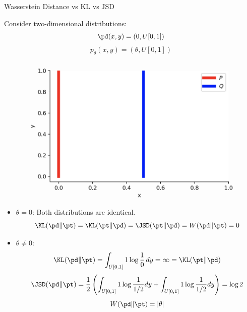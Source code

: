 \documentclass{beamer}
\begin{document}
\begin{frame}{Wasserstein Distance vs KL vs JSD}
	\begin{minipage}[t]{0.48\columnwidth}
		Consider two-dimensional distributions:
		\vspace{-0.3cm}
		\[
			\pd(x, y) = (0, U[0, 1])
		\]	
		\[
			p_{\theta}(x, y) = (\theta, U[0, 1])
		\]
	\end{minipage}%
	\begin{minipage}[t]{0.52\columnwidth}
		\vspace{-0.3cm}
		\begin{figure}
			\centering
			\includegraphics[width=0.8\linewidth]{figs/w_kl_jsd}
		\end{figure}
	\end{minipage}
	\vspace{-0.3cm}
	\eqpause
	\begin{itemize}
		\footnotesize
		\item $\theta = 0$: Both distributions are identical.
		\[
			\KL(\pd \| \pt) = \KL(\pt \| \pd) = \JSD(\pt \| \pd) = W(\pd \| \pt) = 0
		\]
		\vspace{-0.5cm}
		\eqpause
		\item $\theta \neq 0$:
		\vspace{-0.3cm}
		\[
			\KL(\pd \| \pt) = \int_{U[0, 1]} 1 \log \frac{1}{0}\,dy = \infty = \KL(\pt \| \pd)
		\]
		\eqpause
		\[
			\JSD(\pd \| \pt) = \frac{1}{2}\left( \int_{U[0, 1]}1 \log \frac{1}{1/2} dy + \int_{U[0, 1]}1 \log \frac{1}{1/2} dy \right) = \log 2
		\]
		\eqpause
		\[
			W(\pd \| \pt) = |\theta|
		\]
	\end{itemize}
\end{frame}
\end{document}
